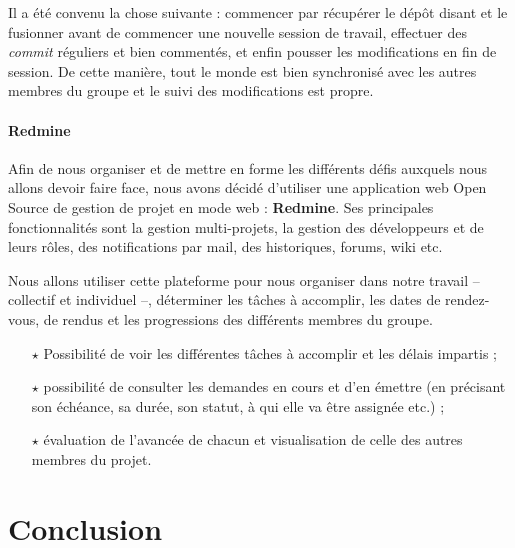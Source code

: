 Il a été convenu la chose suivante : commencer par récupérer le dépôt disant et le fusionner avant de commencer une nouvelle session de travail, effectuer des \textit{commit} réguliers et bien commentés, et enfin pousser les modifications en fin de session. De cette manière, tout le monde est bien synchronisé avec les autres membres du groupe et le suivi des modifications est propre.

\paragraph*{Redmine\\}
Afin de nous organiser et de mettre en forme les différents défis auxquels nous allons devoir faire face, nous avons décidé d'utiliser une application web Open Source de gestion de projet en mode web : \textbf{Redmine}. Ses principales fonctionnalités sont la gestion multi-projets, la gestion des développeurs et de leurs rôles, des notifications par mail, des historiques, forums, wiki etc.

Nous allons utiliser cette plateforme pour nous organiser dans notre travail -- collectif et individuel --, déterminer les tâches à accomplir, les dates de rendez-vous, de rendus et les progressions des différents membres du groupe.

\begin{itemize}
  \item[$\star$] Possibilité de voir les différentes tâches à accomplir et les délais impartis ;
  \item[$\star$] possibilité de consulter les demandes en cours et d'en émettre (en précisant son échéance, sa durée, son statut, à qui elle va être assignée etc.) ;
  \item[$\star$] évaluation de l'avancée de chacun et visualisation de celle des autres membres du projet.
\end{itemize}




\section{Conclusion}

